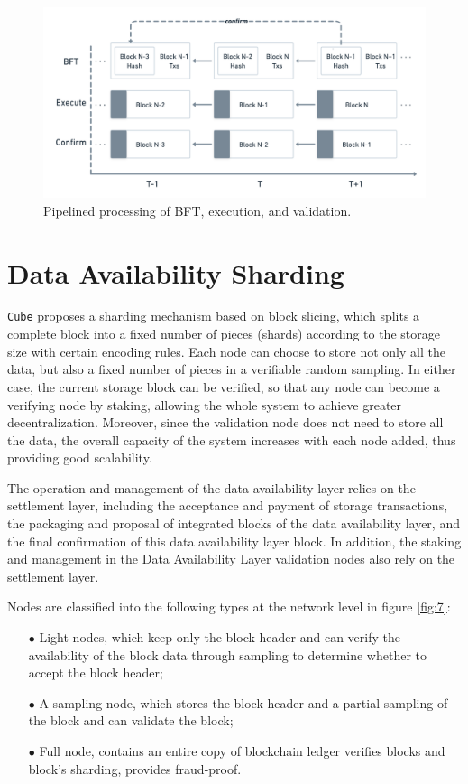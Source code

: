\documentclass{iacrtrans}
\begin{document}
\begin{figure}[!htbp]
	\centering
	\includegraphics[width=0.8 \textwidth]{images/6.png}
	\caption{Pipelined processing of BFT, execution, and validation.}
	\label{fig:6} 
\end{figure}

\section{Data Availability Sharding}
\texttt{Cube} proposes a sharding mechanism based on block slicing, which splits a complete block into a fixed number of pieces (shards) according to the storage size with certain encoding rules. Each node can choose to store not only all the data, but also a fixed number of pieces in a verifiable random sampling. In either case, the current storage block can be verified, so that any node can become a verifying node by staking, allowing the whole system to achieve greater decentralization. Moreover, since the validation node does not need to store all the data, the overall capacity of the system increases with each node added, thus providing good scalability.

The operation and management of the data availability layer relies on the settlement layer, including the acceptance and payment of storage transactions, the packaging and proposal of integrated blocks of the data availability layer, and the final confirmation of this data availability layer block. In addition, the staking and management in the Data Availability Layer validation nodes also rely on the settlement layer.

Nodes are classified into the following types at the network level in figure \ref{fig:7}:
\begin{itemize}	
	\item[$\bullet$] Light nodes, which keep only the block header and can verify the availability of the block data through sampling to determine whether to accept the block header;
	\item[$\bullet$] A sampling node, which stores the block header and a partial sampling of the block and can validate the block;
	\item[$\bullet$] Full node, contains an entire copy of blockchain ledger verifies blocks and block's sharding, provides fraud-proof.
\end{itemize}
\end{document}
